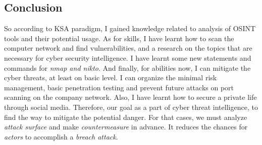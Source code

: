 \documentclass[12pt, letterpaper, twoside]{article}
\begin{document}

\newpage

\subsection{Conclusion}
So according to KSA paradigm, I gained knowledge related to analysis of OSINT tools and their potential usage. As for skills, I have learnt how to scan the computer network and find vulnerabilities, and a research on the topics that are necessary for cyber security intelligence. I have learnt some new statements and commands for \textit{nmap and nikto}. And finally, for abilities now, I can mitigate the cyber threats, at least on basic level. I can organize the minimal risk management, basic penetration testing and prevent future attacks on port scanning on the company network. Also, I have learnt how to secure a private life through social media.   
Therefore, our goal as a part of cyber threat intelligence, to find the way to mitigate the potential danger. For that cases, we must analyze \textit{attack surface} and make \textit{countermeasure} in advance. It reduces the chances for \textit{actors} to accomplish a \textit{breach attack}. 




\newpage



\end{document}
